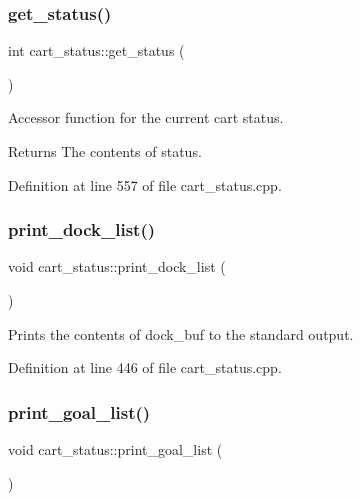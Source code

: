 \subsubsection{\texorpdfstring{get\+\_\+status()}{get\_status()}}
{\footnotesize\ttfamily int cart\+\_\+status\+::get\+\_\+status (\begin{DoxyParamCaption}{ }\end{DoxyParamCaption})}

Accessor function for the current cart status. \begin{DoxyReturn}{Returns}
The contents of status. 
\end{DoxyReturn}


Definition at line 557 of file cart\+\_\+status.\+cpp.

\mbox{\label{classcart__status_ae58ecd2c7d79aa9d35eec0bbfd1c7a32}} 
\subsubsection{\texorpdfstring{print\+\_\+dock\+\_\+list()}{print\_dock\_list()}}
{\footnotesize\ttfamily void cart\+\_\+status\+::print\+\_\+dock\+\_\+list (\begin{DoxyParamCaption}{ }\end{DoxyParamCaption})}

Prints the contents of dock\+\_\+buf to the standard output. 

Definition at line 446 of file cart\+\_\+status.\+cpp.

\mbox{\label{classcart__status_a07d3f2bf7b4e430645ae22ffb46143cb}} 
\subsubsection{\texorpdfstring{print\+\_\+goal\+\_\+list()}{print\_goal\_list()}}
{\footnotesize\ttfamily void cart\+\_\+status\+::print\+\_\+goal\+\_\+list (\begin{DoxyParamCaption}{ }\end{DoxyParamCaption})}

